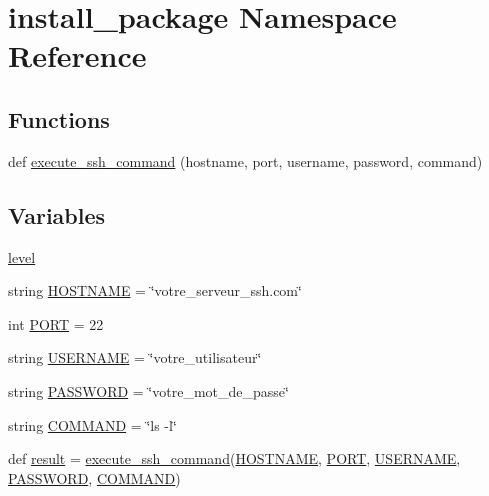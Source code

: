 \hypertarget{namespaceinstall__package}{}\section{install\+\_\+package Namespace Reference}
\label{namespaceinstall__package}
\subsection*{Functions}
\begin{DoxyCompactItemize}
\item 
def \hyperlink{namespaceinstall__package_a42a6d7d8adb7f681d019e52307b723c8}{execute\+\_\+ssh\+\_\+command} (hostname, port, username, password, command)
\end{DoxyCompactItemize}
\subsection*{Variables}
\begin{DoxyCompactItemize}
\item 
\hyperlink{namespaceinstall__package_a09d052de767c89d5fa1295215686dd31}{level}
\item 
string \hyperlink{namespaceinstall__package_a6cdc52ac805c6d2bee7e03a30dd65e08}{H\+O\+S\+T\+N\+A\+ME} = \char`\"{}votre\+\_\+serveur\+\_\+ssh.\+com\char`\"{}
\item 
int \hyperlink{namespaceinstall__package_a8fa4d0174c6c45253d8e8c21c1139e70}{P\+O\+RT} = 22
\item 
string \hyperlink{namespaceinstall__package_a943c3530ca14efbcf3f81a1df7b8c6e2}{U\+S\+E\+R\+N\+A\+ME} = \char`\"{}votre\+\_\+utilisateur\char`\"{}
\item 
string \hyperlink{namespaceinstall__package_a3d33bc00d252344b0d3a00c4df7ea365}{P\+A\+S\+S\+W\+O\+RD} = \char`\"{}votre\+\_\+mot\+\_\+de\+\_\+passe\char`\"{}
\item 
string \hyperlink{namespaceinstall__package_a4c23108a299350f164877e17265d5966}{C\+O\+M\+M\+A\+ND} = \char`\"{}ls -\/l\char`\"{}
\item 
def \hyperlink{namespaceinstall__package_a50b9608065a7c7ad45282db7394d31d3}{result} = \hyperlink{namespaceinstall__package_a42a6d7d8adb7f681d019e52307b723c8}{execute\+\_\+ssh\+\_\+command}(\hyperlink{namespaceinstall__package_a6cdc52ac805c6d2bee7e03a30dd65e08}{H\+O\+S\+T\+N\+A\+ME}, \hyperlink{namespaceinstall__package_a8fa4d0174c6c45253d8e8c21c1139e70}{P\+O\+RT}, \hyperlink{namespaceinstall__package_a943c3530ca14efbcf3f81a1df7b8c6e2}{U\+S\+E\+R\+N\+A\+ME}, \hyperlink{namespaceinstall__package_a3d33bc00d252344b0d3a00c4df7ea365}{P\+A\+S\+S\+W\+O\+RD}, \hyperlink{namespaceinstall__package_a4c23108a299350f164877e17265d5966}{C\+O\+M\+M\+A\+ND})
\end{DoxyCompactItemize}


